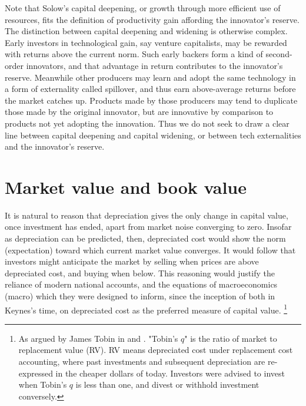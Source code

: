 \documentclass[a4padisinvitingper,fleqn]{latex_styles/cas-sc}
\begin{document}
Note that Solow's capital deepening, or growth through more efficient use of resources, fits the definition of productivity gain affording the innovator's reserve. The distinction between capital deepening and widening is otherwise complex. Early investors in technological gain, say venture capitalists, may be rewarded with returns above the current norm. Such early backers form a kind of second-order innovators, and that advantage in return contributes to the innovator's reserve. Meanwhile other producers may learn and adopt the same technology in a form of externality called spillover, and thus earn above-average returns before the market catches up. Products made by those producers may tend to duplicate those made by the original innovator, but are innovative by comparison to products not yet adopting the innovation. Thus we do not seek to draw a clear line between capital deepening and capital widening, or between tech externalities and the innovator's reserve.








\section{Market value and book value}\label{market-value-and-book-value}

It is natural to reason that depreciation gives the only change in capital value, once investment has ended, apart from market noise converging to zero. Insofar as depreciation can be predicted, then, depreciated cost would show the norm (expectation) toward which current market value converges. It would follow that investors might anticipate the market by selling when prices are above depreciated cost, and buying when below.
%
This reasoning would justify the reliance of modern national accounts, and the equations of macroeconomics (macro) which they were designed to inform, since the inception of both in Keynes's time, on depreciated cost as the preferred measure of capital value. \footnote{As argued by James Tobin in \citeyear{tobin1968} and \citeyear{tobin1969}. "Tobin's \(q\)" is the ratio of market to replacement value (RV). RV means depreciated cost under replacement cost accounting, where past investments and subsequent depreciation are re-expressed in the cheaper dollars of today. Investors were advised to invest when Tobin's \(q\) is less than one, and divest or withhold investment conversely.}
\end{document}
